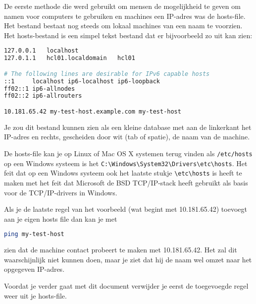 De eerste methode die werd gebruikt om mensen de mogelijkheid te geven om namen voor computers te gebruiken en machines een IP-adres was de hosts-file. Het bestand bestaat nog steeds om lokaal machines van een naam te voorzien. Het hosts-bestand is een simpel tekst bestand dat er bijvoorbeeld zo uit kan zien:

\begin{lstlisting}[language=bash]
127.0.0.1	localhost
127.0.1.1	hcl01.localdomain	hcl01

# The following lines are desirable for IPv6 capable hosts
::1     localhost ip6-localhost ip6-loopback
ff02::1 ip6-allnodes
ff02::2 ip6-allrouters

10.181.65.42 my-test-host.example.com my-test-host
\end{lstlisting}

Je zou dit bestand kunnen zien als een kleine database met aan de linkerkant het IP-adres en rechts, gescheiden door wit (tab of spatie), de naam van de machine.

De hosts-file kan je op Linux of Mac OS X systemen terug vinden als \texttt{/etc/hosts} op een Windows systeem is het \texttt{C:\textbackslash Windows\textbackslash System32\textbackslash Drivers\textbackslash etc\textbackslash hosts}. Het feit dat op een Windows systeem ook het laatste stukje \texttt{\textbackslash etc\textbackslash hosts} is heeft te maken met het feit dat Microsoft de BSD TCP/IP-stack heeft gebruikt als basis voor de TCP/IP-drivers in Windows.

Als je de laatste regel van het voorbeeld (wat begint met 10.181.65.42) toevoegt aan je eigen hosts file dan kan je met
\begin{lstlisting}[language=bash]
ping my-test-host
\end{lstlisting}
zien dat de machine contact probeert te maken met 10.181.65.42. Het zal dit waarschijnlijk niet kunnen doen, maar je ziet dat hij de naam wel omzet naar het opgegeven IP-adres.

Voordat je verder gaat met dit document verwijder je eerst de toegevoegde regel weer uit je hosts-file.

